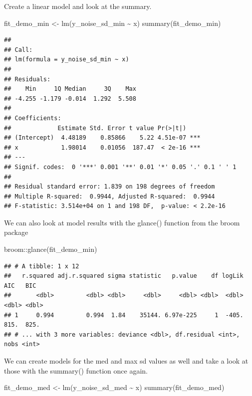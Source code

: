 \documentclass[
]{book}
\newenvironment{Shaded}{\begin{snugshade}}{\end{snugshade}}
\newcommand{\FunctionTok}[1]{\textcolor[rgb]{0.00,0.00,0.00}{#1}}
\newcommand{\NormalTok}[1]{#1}
\newcommand{\OtherTok}[1]{\textcolor[rgb]{0.56,0.35,0.01}{#1}}
\newcommand{\SpecialCharTok}[1]{\textcolor[rgb]{0.00,0.00,0.00}{#1}}
\begin{document}
Create a linear model and look at the summary.

\begin{Shaded}
\begin{Highlighting}[]
\NormalTok{fit\_demo\_min }\OtherTok{\textless{}{-}} \FunctionTok{lm}\NormalTok{(y\_noise\_sd\_min }\SpecialCharTok{\textasciitilde{}}\NormalTok{ x)}
\FunctionTok{summary}\NormalTok{(fit\_demo\_min)}
\end{Highlighting}
\end{Shaded}

\begin{verbatim}
## 
## Call:
## lm(formula = y_noise_sd_min ~ x)
## 
## Residuals:
##    Min     1Q Median     3Q    Max 
## -4.255 -1.179 -0.014  1.292  5.508 
## 
## Coefficients:
##             Estimate Std. Error t value Pr(>|t|)    
## (Intercept)  4.48189    0.85866    5.22 4.51e-07 ***
## x            1.98014    0.01056  187.47  < 2e-16 ***
## ---
## Signif. codes:  0 '***' 0.001 '**' 0.01 '*' 0.05 '.' 0.1 ' ' 1
## 
## Residual standard error: 1.839 on 198 degrees of freedom
## Multiple R-squared:  0.9944, Adjusted R-squared:  0.9944 
## F-statistic: 3.514e+04 on 1 and 198 DF,  p-value: < 2.2e-16
\end{verbatim}

We can also look at model results with the glance() function from the broom package

\begin{Shaded}
\begin{Highlighting}[]
\NormalTok{broom}\SpecialCharTok{::}\FunctionTok{glance}\NormalTok{(fit\_demo\_min)}
\end{Highlighting}
\end{Shaded}

\begin{verbatim}
## # A tibble: 1 x 12
##   r.squared adj.r.squared sigma statistic   p.value    df logLik   AIC   BIC
##       <dbl>         <dbl> <dbl>     <dbl>     <dbl> <dbl>  <dbl> <dbl> <dbl>
## 1     0.994         0.994  1.84    35144. 6.97e-225     1  -405.  815.  825.
## # ... with 3 more variables: deviance <dbl>, df.residual <int>, nobs <int>
\end{verbatim}

We can create models for the med and max sd values as well and take a look at those with the summary() function once again.

\begin{Shaded}
\begin{Highlighting}[]
\NormalTok{fit\_demo\_med }\OtherTok{\textless{}{-}} \FunctionTok{lm}\NormalTok{(y\_noise\_sd\_med }\SpecialCharTok{\textasciitilde{}}\NormalTok{ x)}
\FunctionTok{summary}\NormalTok{(fit\_demo\_med)}
\end{Highlighting}
\end{Shaded}
\end{document}
